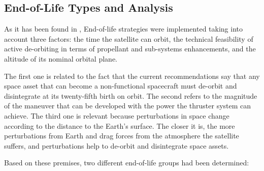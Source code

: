 \subsection{End-of-Life Types and Analysis}
As it has been found in \cite{cornara}, End-of-life strategies were implemented taking into account three factors: the time the satellite can orbit, the technical feasibility of active de-orbiting in terms of propellant and sub-systems enhancements, and the altitude of its nominal orbital plane. 

The first one is related to the fact that the current recommendations say that any space asset that can become a non-functional spacecraft must de-orbit and disintegrate at its twenty-fifth birth on orbit. The second refers to the magnitude of the maneuver that can be developed with the power the thruster system can achieve. The third one is relevant because perturbations in space change according to the distance to the Earth’s surface. The closer it is, the more perturbations from Earth and drag forces from the atmosphere the satellite suffers, and perturbations help to de-orbit and disintegrate space assets.

Based on these premises, two different end-of-life groups had been determined: 

